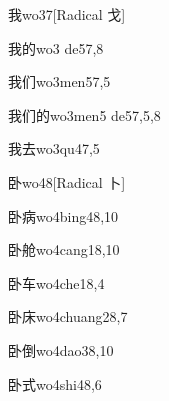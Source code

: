 \begin{verbete}{我}{wo3}{7}[Radical 戈]
\end{verbete}

\begin{verbete}{我的}{wo3 de5}{7,8}
\end{verbete}

\begin{verbete}{我们}{wo3men5}{7,5}
\end{verbete}

\begin{verbete}{我们的}{wo3men5 de5}{7,5,8}
\end{verbete}

\begin{verbete}{我去}{wo3qu4}{7,5}
\end{verbete}

\begin{verbete}{卧}{wo4}{8}[Radical 卜]
\end{verbete}

\begin{verbete}{卧病}{wo4bing4}{8,10}
\end{verbete}

\begin{verbete}{卧舱}{wo4cang1}{8,10}
\end{verbete}

\begin{verbete}{卧车}{wo4che1}{8,4}
\end{verbete}

\begin{verbete}{卧床}{wo4chuang2}{8,7}
\end{verbete}

\begin{verbete}{卧倒}{wo4dao3}{8,10}
\end{verbete}

\begin{verbete}{卧式}{wo4shi4}{8,6}
\end{verbete}

